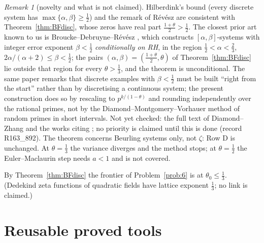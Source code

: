 \documentclass[11pt]{amsart}
\theoremstyle{definition}
\theoremstyle{remark}
\newtheorem{remark}[theorem]{Remark}
\begin{document}
\begin{remark}[novelty and what is not claimed]\label{rem:BFnovelty}
Hilberdink's bound (every discrete system has $\max\{\alpha,\beta\}\ge\frac12$) and the remark of R\'ev\'esz
\cite[Rem.~7]{Revesz2023} are consistent with Theorem~\ref{thm:BFdisc}, whose zeros have real part $\frac{1+\theta}2>\frac12$.
The closest prior art known to us is Broucke--Debruyne--R\'ev\'esz \cite[Thm.~1.3]{BDR2023}, which constructs
$[\alpha,\beta]$-systems with integer error exponent $\beta<\frac12$ \emph{conditionally on RH}, in the region
$\frac12<\alpha<\frac23$, $2\alpha/(\alpha+2)\le\beta<\frac12$; the pairs $(\alpha,\beta)=(\frac{1+\theta}2,\theta)$ of
Theorem~\ref{thm:BFdisc} lie outside that region for every $\theta>\frac13$, and the theorem is unconditional. The same paper
remarks that discrete examples with $\beta<\frac12$ must be built ``right from the start'' rather than by discretising a
continuous system; the present construction does so by rescaling to $p^{k/(1-\theta)}$ and rounding independently over the
rational primes, not by the Diamond--Montgomery--Vorhauer method of random primes in short intervals. Not yet checked: the
full text of Diamond--Zhang \cite[Ch.~17]{DiamondZhang2016} and the works citing \cite{BDR2023}; no priority is claimed until
this is done (record R163\_892). The theorem concerns Beurling systems only, not $\zeta$: Row D is unchanged. At $\theta=\frac13$ the
variance diverges and the method stops; at $\theta=\frac12$ the Euler--Maclaurin step needs $a<1$ and is not covered.
\end{remark}

\noindent By Theorem~\ref{thm:BFdisc} the frontier of Problem~\ref{prob:6} is at $\theta_0\le\frac13$. (Dedekind zeta
functions of quadratic fields have lattice exponent $\frac13$; no link is claimed.)

\section{Reusable proved tools}\label{sec:tools}
\end{document}
